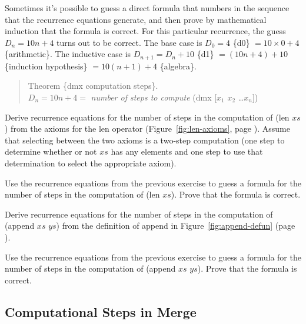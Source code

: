 Sometimes it's possible to guess a direct formula that numbers in the
sequence that the recurrence equations generate,
and then prove by mathematical induction that the formula is correct.
For this particular recurrence, the guess
$D_n = 10 n + 4$ turns out to be correct.
The base case is $D_0 = 4$ \{d0\} $ = 10 \times 0 + 4$ \{arithmetic\}.
The inductive case is
$D_{n+1} = D_n + 10$ \{d1\} $ = (10 n + 4) + 10$ \{induction hypothesis\}
$= 10(n+1) + 4$ \{algebra\}.

\label{thm:dmx-computation-time}
\begin{quote}
Theorem \{dmx computation steps\}. \\
$D_n = 10 n + 4 =$
\emph{number of steps to compute} (dmx [$x_1$ $x_2$ \dots $x_n$])
\end{quote}

\begin{ExerciseList}

\Exercise
Derive recurrence equations for the number of steps in the computation of (len $xs$)
from the axioms for the len operator (Figure~\ref{fig:len-axioms}, page \pageref{fig:len-axioms}).
Assume that selecting between the two axioms is a two-step computation
(one step to determine whether or not $xs$ has any elements
and one step to use that determination to select the appropriate axiom).

\Exercise
Use the recurrence equations from the previous exercise to
guess a formula for the number of steps in the computation of (len $xs$).
Prove that the formula is correct.

\Exercise
Derive recurrence equations for the number of steps in the computation of (append $xs$ $ys$)
from the definition of append in Figure~\ref{fig:append-defun} (page \pageref{fig:append-defun}).

\Exercise
Use the recurrence equations from the previous exercise to
guess a formula for the number of steps in the computation of (append $xs$ $ys$).
Prove that the formula is correct.

\end{ExerciseList}

\subsection{Computational Steps in Merge}
\label{subsec:mrg-steps}

